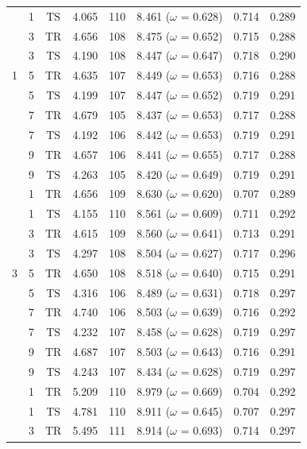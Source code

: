 \documentclass[doc,natbib,floatsintext]{apa7}
\begin{document}
\begin{appendices}
\begin{table}[!ht]
\begin{center}
{\begin{tabular}{c c c c c c c c}
& 1 & $\text{TS}$ & 4.065 & 110 & 8.461 ($\omega$ = 0.628) & 0.714 & 0.289\\
& 3 & $\text{TR}$ & 4.656 & 108 & 8.475 ($\omega$ = 0.652) & 0.715 & 0.288\\
& 3 & $\text{TS}$ & 4.190 & 108 & 8.447 ($\omega$ = 0.647) & 0.718 & 0.290\\
1 & 5 & $\text{TR}$ & 4.635 & 107 & 8.449 ($\omega$ = 0.653) & 0.716 & 0.288\\
& 5 & $\text{TS}$ & 4.199 & 107 & 8.447 ($\omega$ = 0.652) & 0.719 & 0.291\\
& 7 & $\text{TR}$ & 4.679 & 105 & 8.437 ($\omega$ = 0.653) & 0.717 & 0.288\\
& 7 & $\text{TS}$ & 4.192 & 106 & 8.442 ($\omega$ = 0.653) & 0.719 & 0.291\\
& 9 & $\text{TR}$ & 4.657 & 106 & 8.441 ($\omega$ = 0.655) & 0.717 & 0.288\\
& 9 & $\text{TS}$ & 4.263 & 105 & 8.420 ($\omega$ = 0.649) & 0.719 & 0.291\\
\midrule
& 1 & $\text{TR}$ & 4.656 & 109 & 8.630 ($\omega$ = 0.620) & 0.707 & 0.289\\
& 1 & $\text{TS}$ & 4.155 & 110 & 8.561 ($\omega$ = 0.609) & 0.711 & 0.292\\
& 3 & $\text{TR}$ & 4.615 & 109 & 8.560 ($\omega$ = 0.641) & 0.713 & 0.291\\
& 3 & $\text{TS}$ & 4.297 & 108 & 8.504 ($\omega$ = 0.627) & 0.717 & 0.296\\
3 & 5 & $\text{TR}$ & 4.650 & 108 & 8.518 ($\omega$ = 0.640) & 0.715 & 0.291\\
& 5 & $\text{TS}$ & 4.316 & 106 & 8.489 ($\omega$ = 0.631) & 0.718 & 0.297\\
& 7 & $\text{TR}$ & 4.740 & 106 & 8.503 ($\omega$ = 0.639) & 0.716 & 0.292\\
& 7 & $\text{TS}$ & 4.232 & 107 & 8.458 ($\omega$ = 0.628) & 0.719 & 0.297\\
& 9 & $\text{TR}$ & 4.687 & 107 & 8.503 ($\omega$ = 0.643) & 0.716 & 0.291\\
& 9 & $\text{TS}$ & 4.243 & 107 & 8.434 ($\omega$ = 0.628) & 0.719 & 0.297\\
\midrule
& 1 & $\text{TR}$ & 5.209 & 110 & 8.979 ($\omega$ = 0.669) & 0.704 & 0.292\\
& 1 & $\text{TS}$ & 4.781 & 110 & 8.911 ($\omega$ = 0.645) & 0.707 & 0.297\\
& 3 & $\text{TR}$ & 5.495 & 111 & 8.914 ($\omega$ = 0.693) & 0.714 & 0.297\\

\end{tabular}}
\end{center}
\end{table}
\end{appendices}
\end{document}
